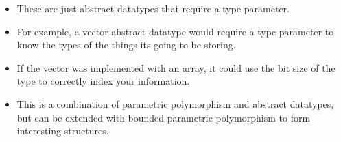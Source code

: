 \begin{itemize}[noitemsep]
\item These are just abstract datatypes that require a type parameter.
\item For example, a vector abstract datatype would require a type parameter to know the types of the things its going to be storing.
\item If the vector was implemented with an array, it could use the bit size of the type to correctly index your information.
\item This is a combination of parametric polymorphism and abstract datatypes, but can be extended with bounded parametric polymorphism to form interesting structures.
\end{itemize}

